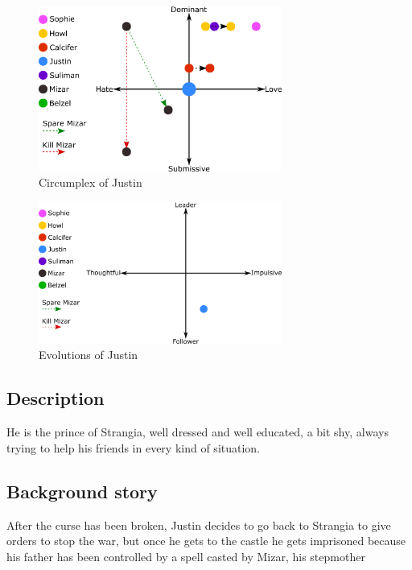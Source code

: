 \begin{figure}[H]
  \centering
  \includegraphics[width=8cm]{Images/SVG/Exported/Circumplexes/justinCircumplex}
  \caption{Circumplex of Justin}
\end{figure}

\begin{figure}[H]
  \centering
   \includegraphics[width=8cm]{Images/SVG/Exported/Evolutions/justinEvolution}
  \caption{Evolutions of Justin}
\end{figure}

\subsection{Description}
He is the prince of Strangia, well dressed and well educated, a bit shy, always trying to help his friends in every kind of situation.

\subsection{Background story}
 After the curse has been broken, Justin decides to go back to Strangia to give orders to stop the war, but once he gets to the castle he gets imprisoned because his father has been controlled by a spell casted by Mizar, his stepmother



